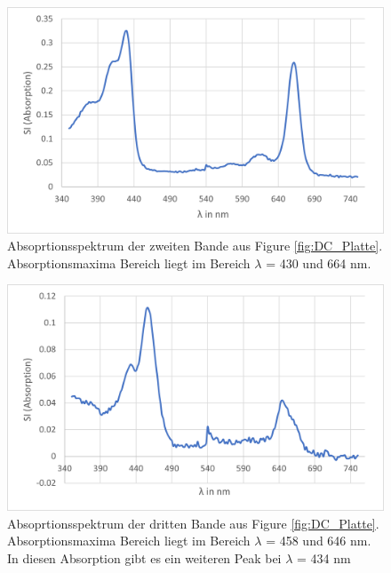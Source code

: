 \documentclass[10pt,a4paper]{article}
\begin{document}
			\begin{figure}[H]
				\centering
				\includegraphics[scale=1]{secondband.png}
				\caption{Absoprtionsspektrum der zweiten Bande aus Figure \ref{fig:DC_Platte}. Absorptionsmaxima Bereich liegt im Bereich $\lambda$ = 430 und 664 nm.}
				\label{fig:zweite Bande}
			\end{figure}
			
			\begin{figure}[H]
				\centering
				\includegraphics[scale=1]{thirdband.png}
				\caption{Absoprtionsspektrum der dritten Bande aus Figure \ref{fig:DC_Platte}. Absorptionsmaxima Bereich liegt im Bereich $\lambda$ = 458 und 646 nm. In diesen Absorption gibt es ein weiteren Peak bei $\lambda$ = 434 nm}
				\label{fig:dritte Bande}
			\end{figure}
			
\end{document}
